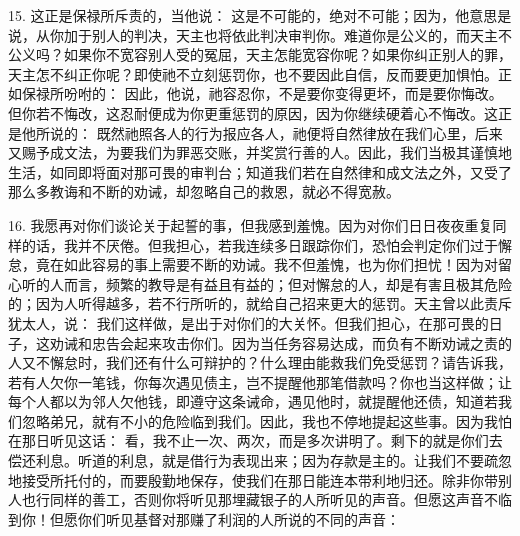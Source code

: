 15. 这正是保禄所斥责的，当他说： 这是不可能的，绝对不可能；因为，他意思是说，从你加于别人的判决，天主也将依此判决审判你。难道你是公义的，而天主不公义吗？如果你不宽容别人受的冤屈，天主怎能宽容你呢？如果你纠正别人的罪，天主怎不纠正你呢？即使祂不立刻惩罚你，也不要因此自信，反而要更加惧怕。正如保禄所吩咐的： 因此，他说，祂容忍你，不是要你变得更坏，而是要你悔改。但你若不悔改，这忍耐便成为你更重惩罚的原因，因为你继续硬着心不悔改。这正是他所说的： 既然祂照各人的行为报应各人，祂便将自然律放在我们心里，后来又赐予成文法，为要我们为罪恶交账，并奖赏行善的人。因此，我们当极其谨慎地生活，如同即将面对那可畏的审判台；知道我们若在自然律和成文法之外，又受了那么多教诲和不断的劝诫，却忽略自己的救恩，就必不得宽赦。\par

16. 我愿再对你们谈论关于起誓的事，但我感到羞愧。因为对你们日日夜夜重复同样的话，我并不厌倦。但我担心，若我连续多日跟踪你们，恐怕会判定你们过于懈怠，竟在如此容易的事上需要不断的劝诫。我不但羞愧，也为你们担忧！因为对留心听的人而言，频繁的教导是有益且有益的；但对懈怠的人，却是有害且极其危险的；因为人听得越多，若不行所听的，就给自己招来更大的惩罚。天主曾以此责斥犹太人，说： 我们这样做，是出于对你们的大关怀。但我们担心，在那可畏的日子，这劝诫和忠告会起来攻击你们。因为当任务容易达成，而负有不断劝诫之责的人又不懈怠时，我们还有什么可辩护的？什么理由能救我们免受惩罚？请告诉我，若有人欠你一笔钱，你每次遇见债主，岂不提醒他那笔借款吗？你也当这样做；让每个人都以为邻人欠他钱，即遵守这条诫命，遇见他时，就提醒他还债，知道若我们忽略弟兄，就有不小的危险临到我们。因此，我也不停地提起这些事。因为我怕在那日听见这话： 看，我不止一次、两次，而是多次讲明了。剩下的就是你们去偿还利息。听道的利息，就是借行为表现出来；因为存款是主的。让我们不要疏忽地接受所托付的，而要殷勤地保存，使我们在那日能连本带利地归还。除非你带别人也行同样的善工，否则你将听见那埋藏银子的人所听见的声音。但愿这声音不临到你！但愿你们听见基督对那赚了利润的人所说的不同的声音：\par

